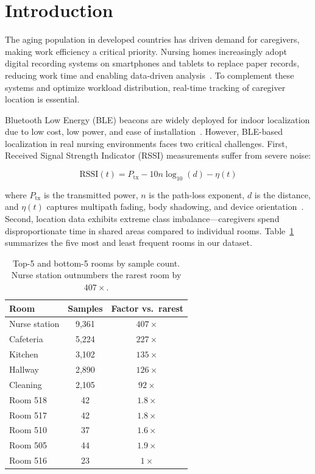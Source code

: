 \section{Introduction}

The aging population in developed countries has driven demand for caregivers, making work efficiency a critical priority. Nursing homes increasingly adopt digital recording systems on smartphones and tablets to replace paper records, reducing work time and enabling data-driven analysis~\cite{okuda2024}. To complement these systems and optimize workload distribution, real-time tracking of caregiver location is essential.

Bluetooth Low Energy (BLE) beacons are widely deployed for indoor localization due to low cost, low power, and ease of installation~\cite{faragher2015}. However, BLE-based localization in real nursing environments faces two critical challenges. First, Received Signal Strength Indicator (RSSI) measurements suffer from severe noise:

\begin{equation}
\text{RSSI}(t) = P_{\text{tx}} - 10n \log_{10}(d) - \eta(t)
\label{eq:rssi_model}
\end{equation}

\noindent where $P_{\text{tx}}$ is the transmitted power, $n$ is the path-loss exponent, $d$ is the distance, and $\eta(t)$ captures multipath fading, body shadowing, and device orientation~\cite{halder2015}. Second, location data exhibits extreme class imbalance---caregivers spend disproportionate time in shared areas compared to individual rooms. Table~\ref{tab:imbalance} summarizes the five most and least frequent rooms in our dataset.

\begin{table}[h]
\centering
\caption{Top-5 and bottom-5 rooms by sample count. Nurse station outnumbers the rarest room by $407\times$.}
\label{tab:imbalance}
\begin{tabular}{lcc}
\toprule
\textbf{Room} & \textbf{Samples} & \textbf{Factor vs.\ rarest} \\
\midrule
Nurse station & 9,361 & $407\times$ \\
Cafeteria     & 5,224 & $227\times$ \\
Kitchen       & 3,102 & $135\times$ \\
Hallway       & 2,890 & $126\times$ \\
Cleaning      & 2,105 & $92\times$  \\
\addlinespace
Room 518      & 42    & $1.8\times$ \\
Room 517      & 42    & $1.8\times$ \\
Room 510      & 37    & $1.6\times$ \\
Room 505      & 44    & $1.9\times$ \\
Room 516      & 23    & $1\times$   \\
\bottomrule
\end{tabular}
\end{table}

